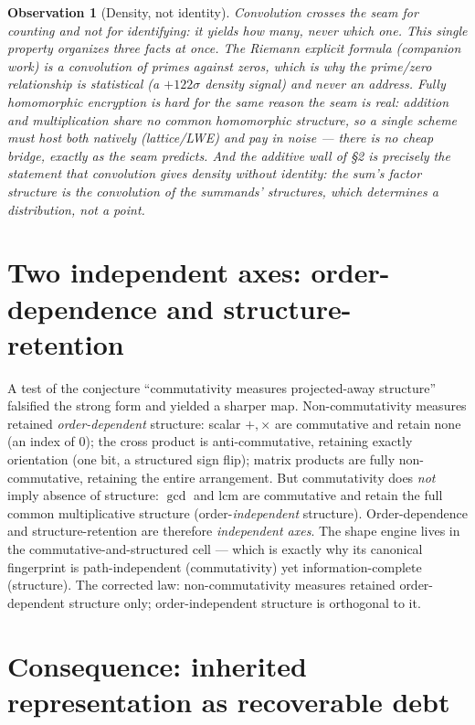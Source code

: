 \documentclass[11pt]{article}
\newtheorem{observation}{Observation}
\begin{document}
\begin{observation}[Density, not identity]
Convolution crosses the seam for \emph{counting} and not for \emph{identifying}: it yields how many, never
which one. This single property organizes three facts at once. The Riemann explicit formula (companion work)
is a convolution of primes against zeros, which is why the prime/zero relationship is statistical (a
$+122\sigma$ density signal) and never an address. Fully homomorphic encryption is hard for the same reason
the seam is real: addition and multiplication share no common homomorphic structure, so a single scheme must
host both natively (lattice/LWE) and pay in noise --- there is no cheap bridge, exactly as the seam predicts.
And the additive wall of \S2 is precisely the statement that convolution gives density without identity: the
sum's factor structure is the convolution of the summands' structures, which determines a distribution, not
a point.
\end{observation}

\section{Two independent axes: order-dependence and structure-retention}

A test of the conjecture ``commutativity measures projected-away structure'' falsified the strong form and
yielded a sharper map. Non-commutativity measures retained \emph{order-dependent} structure: scalar
$+,\times$ are commutative and retain none (an index of $0$); the cross product is anti-commutative,
retaining exactly orientation (one bit, a structured sign flip); matrix products are fully non-commutative,
retaining the entire arrangement. But commutativity does \emph{not} imply absence of structure: $\gcd$ and
$\mathrm{lcm}$ are commutative and retain the full common multiplicative structure (order-\emph{independent}
structure). Order-dependence and structure-retention are therefore \emph{independent axes}. The shape engine
lives in the commutative-and-structured cell --- which is exactly why its canonical fingerprint is
path-independent (commutativity) yet information-complete (structure). The corrected law: non-commutativity
measures retained order-dependent structure only; order-independent structure is orthogonal to it.

\section{Consequence: inherited representation as recoverable debt}
\end{document}
